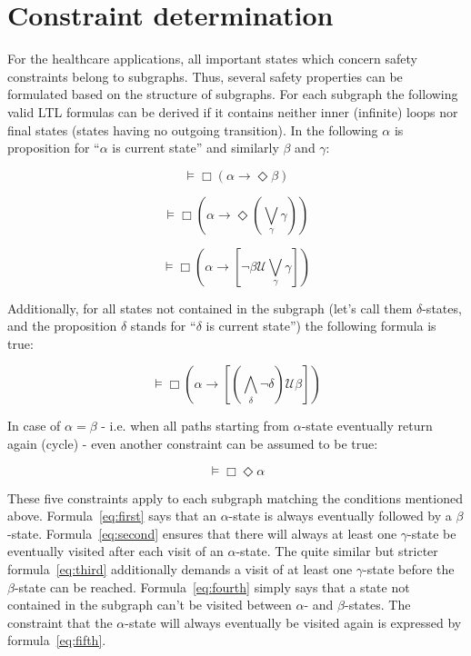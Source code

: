 \section{Constraint determination}

For the healthcare applications, all important states which concern safety constraints belong to subgraphs. Thus, several safety properties can be formulated based on the structure of subgraphs.
For each subgraph the following valid LTL formulas can be derived if it contains neither inner (infinite) loops nor final states (states having no outgoing transition). In the following $\alpha$ is proposition for ``$\alpha$ is current state'' and similarly $\beta$ and $\gamma$:

\begin{equation} \label{eq:first}
  \models \Box (\alpha \rightarrow \Diamond \beta)
\end{equation}

\begin{equation} \label{eq:second}
  \models \Box (\alpha \rightarrow \Diamond (\bigvee_{\gamma} \gamma))
\end{equation}

\begin{equation} \label{eq:third}
  \models \Box (\alpha \rightarrow [\neg \beta \mathcal{U} \bigvee_{\gamma} \gamma])
\end{equation}

Additionally, for all states not contained in the subgraph (let's call them $\delta$-states, and the proposition $\delta$ stands for ``$\delta$ is current state'') the following formula is true: 

\begin{equation} \label{eq:fourth}
  \models \Box (\alpha \rightarrow [(\bigwedge_{\delta} \neg \delta) \mathcal{U} \beta])
\end{equation}

In case of $\alpha = \beta$ - i.e. when all paths starting from $\alpha$-state eventually return again (cycle) - even another constraint can be assumed to be true:

\begin{equation} \label{eq:fifth}
  \models \Box \Diamond \alpha
\end{equation}
 

These five constraints apply to each subgraph matching the conditions mentioned above. Formula~\ref{eq:first} says that an $\alpha$-state is always eventually followed by a $\beta$-state. Formula~\ref{eq:second} ensures that there will always at least one $\gamma$-state be eventually visited after each visit of an $\alpha$-state. The quite similar but stricter formula~\ref{eq:third} additionally demands a visit of at least one $\gamma$-state before the $\beta$-state can be reached. Formula~\ref{eq:fourth} simply says that a state not contained in the subgraph can't be visited between $\alpha$- and $\beta$-states. The constraint that the $\alpha$-state will always eventually be visited again is expressed by formula~\ref{eq:fifth}.

